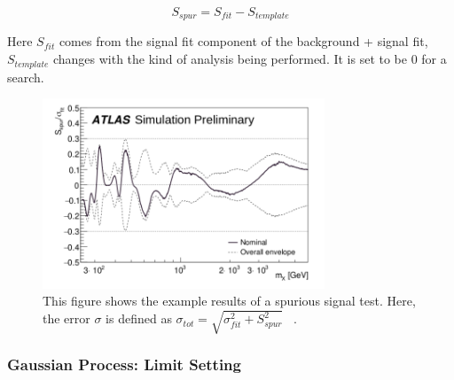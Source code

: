     \begin{equation}
        S_{spur} = S_{fit} - S_{template}
    \end{equation}

    Here $S_{fit}$ comes from the signal fit component of the background + signal fit, $S_{template}$ changes with the kind of analysis being performed. It is set to be 0 for a search. 

    
    \label{sec:spurious}

\begin{figure}[!htb]
    \begin{center}
        \includegraphics[width=0.75\textwidth]{figures/chapter_analysismethod/Spurious}
        \caption{
            This figure shows the example results of a spurious signal test. Here, the error $\sigma$ is defined as $\sigma_{tot} = \sqrt{\sigma^{2}_{fit}+ S_{spur}^{2}}$ ~\cite{ATL-PHYS-PUB-2020-028}.
        }
        \label{spurioussignal}
    \end{center}
\end{figure}
\FloatBarrier

    \subsubsection{Gaussian Process: Limit Setting}

